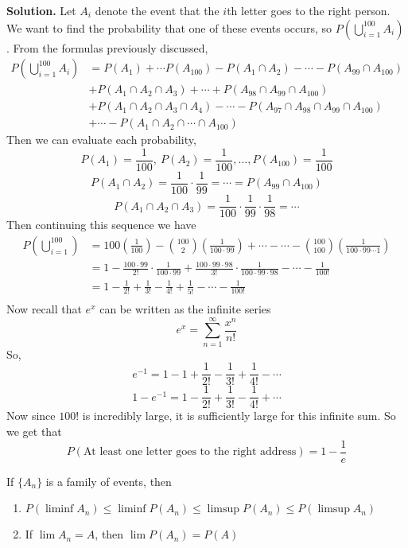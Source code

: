 \textbf{Solution.} Let $A_i$ denote the event that the $i$th letter goes to the right person. We want to find the probability that one of these events occurs, so $P\left(\bigcup\limits_{i=1}^{100} A_i\right)$. From the formulas previously discussed, 
\begin{align*}
    P\left(\bigcup_{i=1}^{100} A_i\right) &= P(A_1) + \cdots P(A_100) - P(A_1 \cap A_2) - \cdots - P(A_{99} \cap A_{100})\\
    &+ P(A_1 \cap A_2 \cap A_3) + \cdots + P(A_{98} \cap A_{99} \cap A_{100})\\
    &+ P(A_1 \cap A_2 \cap A_3 \cap A_4) - \cdots - P(A_{97} \cap A_{98} \cap A_{99} \cap A_{100})\\
    &+ \cdots - P(A_1 \cap A_2 \cap \cdots \cap A_{100})
\end{align*}
Then we can evaluate each probability, 
\[P(A_1) = \frac{1}{100}, \ P(A_2) = \frac{1}{100}, \ldots, P(A_{100}) = \frac{1}{100}\]
\[P(A_1 \cap A_2) = \frac{1}{100} \cdot \frac{1}{99} = \cdots = P(A_{99} \cap A_{100})\]
\[P(A_1 \cap A_2 \cap A_3) = \frac{1}{100} \cdot \frac{1}{99} \cdot \frac{1}{98} = \cdots\]
Then continuing this sequence we have
\begin{align*}
    P\left(\bigcup_{i=1}^{100}\right) &= 100\left(\frac{1}{100}\right) - {100 \choose 2}\left(\frac{1}{100\cdot99}\right)+ \cdots - \cdots - {100 \choose 100}\left(\frac{1}{100 \cdot 99 \cdots 1}\right)\\
    &= 1 - \frac{100 \cdot 99}{2!} \cdot \frac{1}{100 \cdot 99} + \frac{100 \cdot 99 \cdot 98}{3!}\cdot\frac{1}{100 \cdot 99 \cdot 98} - \cdots - \frac{1}{100!}\\
    &= 1 - \frac{1}{2!} + \frac{1}{3!} - \frac{1}{4!} + \frac{1}{5!} - \cdots - \frac{1}{100!}\\ 
\end{align*}
Now recall that $e^x$ can be written as the infinite series 
\[e^x = \sum_{n=1}^\infty \frac{x^n}{n!}\]
So, 
\[e^{-1} = 1 - 1 + \frac{1}{2!} - \frac{1}{3!} + \frac{1}{4!} - \cdots\]
\[1 - e^{-1} = 1 - \frac{1}{2!} + \frac{1}{3!} - \frac{1}{4!} + \cdots\]
Now since $100!$ is incredibly large, it is sufficiently large for this infinite sum. So we get that 
\[P(\text{At least one letter goes to the right address}) = 1 - \frac{1}{e}\]
\begin{lemma}
    If $\{A_n\}$ is a family of events, then 
    \begin{enumerate}
        \item $P(\liminf A_n) \leq \liminf P(A_n) \leq \limsup P(A_n) \leq P(\limsup A_n)$
        \item If $\lim A_n = A$, then $\lim P(A_n) = P(A)$
    \end{enumerate}
\end{lemma}
